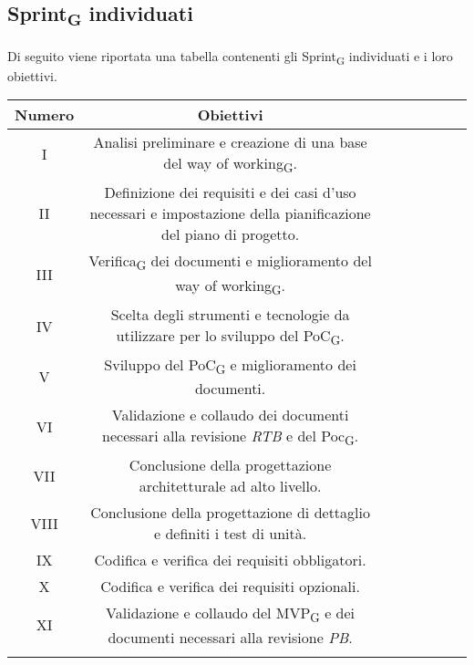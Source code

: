 \subsection{Sprint\textsubscript{G} individuati}
Di seguito viene riportata una tabella contenenti gli Sprint\textsubscript{G} individuati e i loro obiettivi.

\setlength\extrarowheight{5pt}
	\begin{tabularx}{\textwidth}{|ccccccc|c|}
		\hline
		\rowcolor{white}
		\textbf{Numero} & \textbf{Obiettivi}\\
		\hline
		I &  Analisi preliminare e creazione di una base del way of working\textsubscript{G}. \\
		II & Definizione dei requisiti e dei casi d'uso necessari e impostazione della pianificazione del piano di progetto. \\
		III & Verifica\textsubscript{G} dei documenti e miglioramento del way of working\textsubscript{G}. \\
		IV & Scelta degli strumenti e tecnologie da utilizzare per lo sviluppo del PoC\textsubscript{G}. \\
		V & Sviluppo del PoC\textsubscript{G} e miglioramento dei documenti. \\
		VI & Validazione e collaudo dei documenti necessari alla revisione \textit{RTB} e del Poc\textsubscript{G}.\\
		VII & Conclusione della progettazione architetturale ad alto livello. \\
		VIII & Conclusione della progettazione di dettaglio e definiti i test di unità. \\
		IX & Codifica e verifica dei requisiti obbligatori. \\
		X & Codifica e verifica dei requisiti opzionali. \\
		XI & Validazione e collaudo del MVP\textsubscript{G} e dei documenti necessari alla revisione \textit{PB}.\\
		\hline
		\rowcolor{white}
		\caption{ Sprint individuati}
	\end{tabularx}